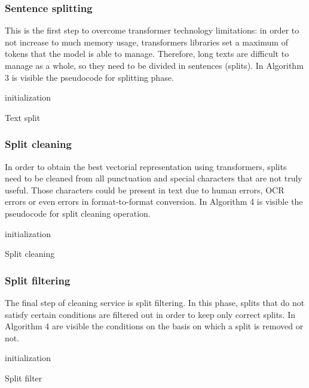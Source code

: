 \documentclass[\main/main.tex]{subfiles}
\begin{document}
\subsubsection{Sentence splitting}
This is the first step to overcome transformer technology limitations: in order to not increase to much memory usage, transformers libraries set a maximum of tokens that the model is able to manage. Therefore, long texts are difficult to manage as a whole, so they need to be divided in sentences (splits). In Algorithm 3 is visible the pseudocode for splitting phase.
\begin{center}
    \begin{algorithm}[H]
     initialization
     \caption{Text split}
    \end{algorithm}
\end{center}
\subsubsection{Split cleaning}
In order to obtain the best vectorial representation using transformers, splits need to be cleaned from all punctuation and special characters that are not truly useful. Those characters could be present in text due to human errors, OCR errors or even errors in format-to-format conversion. In Algorithm 4 is visible the pseudocode for split cleaning operation.
\begin{center}
    \begin{algorithm}[H]
     initialization
     \caption{Split cleaning}
    \end{algorithm}
\end{center}
\subsubsection{Split filtering}
The final step of cleaning service is split filtering. In this phase, splits that do not satisfy certain conditions are filtered out in order to keep only correct splits. In Algorithm 4 are visible the conditions on the basis on which a split is removed or not. 
\begin{center}
    \begin{algorithm}[H]
     initialization
     \caption{Split filter}
    \end{algorithm}
\end{center}
\end{document}
